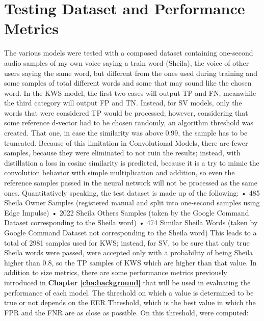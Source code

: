 \section{Testing Dataset and Performance Metrics}
\label{sec:testing dataset and performance metrics}
The various models were tested with a composed dataset containing one-second audio samples of my own voice saying a train word (Sheila), the voice of other users saying the same word, but different from the ones used during training\cite{librispeech} and some samples of total different words and some that may sound like the chosen word. In the KWS model, the first two cases will output TP and FN, meanwhile the third category will output FP and TN. Instead, for SV models, only the words that were considered TP would be processed; however, considering that some reference d-vector had to be chosen randomly, an algorithm threshold was created. That one, in case the similarity was above 0.99, the sample has to be truncated. Because of this limitation in Convolutional Models, there are fewer samples, because they were eliminated to not ruin the results; instead, with distillation a loss in cosine similarity is predicted, because it is a try to mimic the convolution behavior with simple multiplication and addition, so even the reference samples passed in the neural network will not be processed as the same ones.\newline
Quantitatively speaking, the test dataset is made up of the following:\newline
• 485 Sheila Owner Samples (registered manual and split into one-second samples using Edge Impulse\cite{syntiant_tutorial_edgeimpulse})\newline
• 2022 Sheila Others Samples (taken by the Google Command Dataset\cite{speechcommands} corresponding to the Sheila word)\newline
• 474 Similar Sheila Words (taken by Google Command Dataset\cite{speechcommands} not corresponding to the Sheila word)\newline
This leads to a total of 2981 samples used for KWS; instead, for SV, to be sure that only true Sheila words were passed, were accepted only with a probability of being Sheila higher than 0.8, so the TP samples of KWS which are higher than that value.\newline
In addition to size metrics, there are some performance metrics previously introduced in \textbf{Chapter \ref{cha:background}} that will be used in evaluating the performance of each model. The threshold on which a value is determined to be true or not depends on the EER Threshold, which is the best value in which the FPR and the FNR are as close as possible. On this threshold, were computed:\newline
